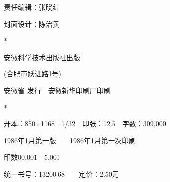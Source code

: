 \documentclass[../outline-of-mechanics.tex]{subfiles}
\begin{document}
\begin{center}
  \fangsong\mbox{}

  \mbox{}\label{publish}

  责任编辑：张晓红

  封面设计：陈治黄

  \vfill {}

  \normalsize {}

  \normalfont{} *

  安徽科学技术出版社出版

   (合肥市跃进路1号)

  \normalsize 安徽省%
  \hspace{0.2em}\hspace{0.2em}%
  发行~~安徽新华印刷厂印刷

  *

  开本：850$\times$1168~~1/32~~印张：12.5~~字数：309,000

  1986年1月第一版~~~~1986年1月第一次印刷

  印数00,001—5,000

  \normalsize 统一书号：13200$\cdot$68~~~~定价：2.50元
\end{center}
\thispagestyle{empty}
\clearpage
\end{document}
